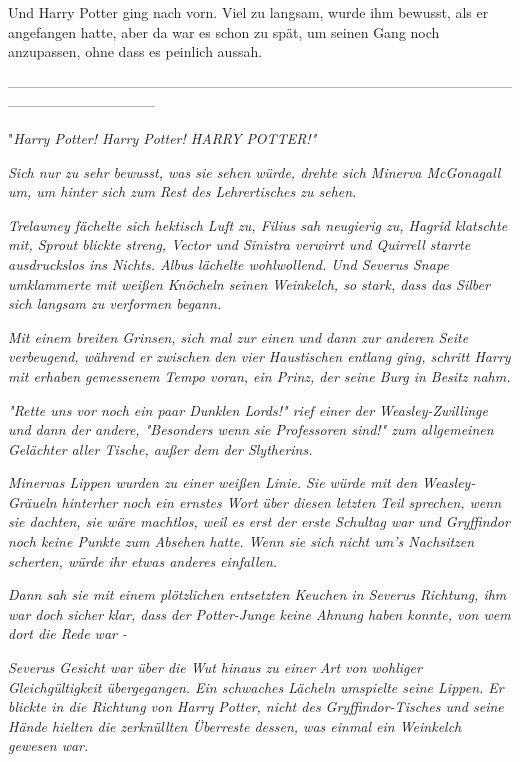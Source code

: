 {Und Harry Potter ging nach vorn. Viel zu langsam, wurde ihm bewusst, als er angefangen hatte, aber da war es schon zu spät, um seinen Gang noch anzupassen, ohne dass es peinlich aussah.

--------------------------------------------------------------------------------------------------------------------------------------------

"\emph{Harry Potter! Harry Potter! HARRY POTTER!"}

\emph{Sich nur zu sehr bewusst, was sie sehen würde, drehte sich Minerva McGonagall um, um hinter sich zum Rest des Lehrertisches zu sehen.}

\emph{Trelawney fächelte sich hektisch Luft zu, Filius sah neugierig zu, Hagrid klatschte mit, Sprout blickte streng, Vector und Sinistra verwirrt und Quirrell starrte ausdruckslos ins Nichts. Albus lächelte wohlwollend. Und Severus Snape umklammerte mit weißen Knöcheln seinen Weinkelch, so stark, dass das Silber sich langsam zu verformen begann.}

\emph{Mit einem breiten Grinsen, sich mal zur einen und dann zur anderen Seite verbeugend, während er zwischen den vier Haustischen entlang ging, schritt Harry mit erhaben gemessenem Tempo voran, ein Prinz, der seine Burg in Besitz nahm.}

\emph{"\emph{Rette uns vor noch ein paar Dunklen Lords!}" rief einer der Weasley-Zwillinge und dann der andere, "\emph{Besonders wenn sie Professoren sind!}" zum allgemeinen Gelächter aller Tische, außer dem der Slytherins.}

\emph{Minervas Lippen wurden zu einer weißen Linie. Sie würde mit den Weasley-Gräueln hinterher noch ein ernstes Wort über diesen letzten Teil sprechen, wenn sie dachten, sie wäre machtlos, weil es erst der erste Schultag war und Gryffindor noch keine Punkte zum Absehen hatte. Wenn sie sich nicht um's Nachsitzen scherten, würde ihr etwas anderes einfallen.}

\emph{Dann sah sie mit einem plötzlichen entsetzten Keuchen in Severus Richtung, ihm war doch} \emph{\emph{sicher}} \emph{klar, dass der Potter-Junge keine Ahnung haben konnte, von wem dort die Rede war -}

\emph{Severus Gesicht war über die Wut hinaus zu einer Art von wohliger Gleichgültigkeit übergegangen. Ein schwaches Lächeln umspielte seine Lippen. Er blickte in die Richtung von Harry Potter, nicht des Gryffindor-Tisches und seine Hände hielten die zerknüllten Überreste dessen, was einmal ein Weinkelch gewesen war.}

}
